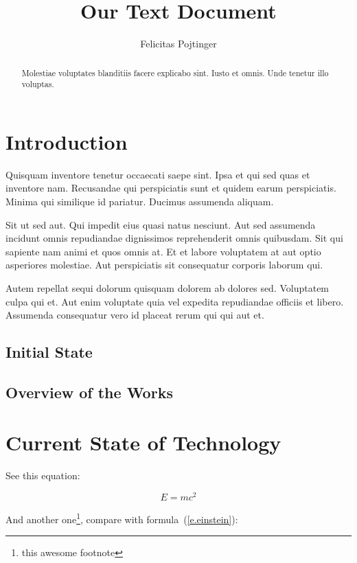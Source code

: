 \documentclass{scrartcl}
\newcommand{\eref}[1]{(\ref{#1})}
\begin{document}
\title{Our Text Document}
\author{Felicitas Pojtinger}
\date{}
\maketitle

\begin{abstract}
    Molestiae voluptates blanditiis facere explicabo sint. Iusto et omnis. Unde tenetur illo voluptas.
\end{abstract}

\section{Introduction}

Quisquam inventore tenetur occaecati saepe sint. Ipsa et qui sed quas et inventore nam. Recusandae qui perspiciatis sunt et quidem earum perspiciatis. Minima qui similique id pariatur. Ducimus assumenda aliquam.

Sit ut sed aut. Qui impedit eius quasi natus nesciunt. Aut sed assumenda incidunt omnis repudiandae dignissimos reprehenderit omnis quibusdam. Sit qui sapiente nam animi et quos omnis at. Et et labore voluptatem at aut optio asperiores molestiae. Aut perspiciatis sit consequatur corporis laborum qui.

Autem repellat sequi dolorum quisquam dolorem ab dolores sed. Voluptatem culpa qui et. Aut enim voluptate quia vel expedita repudiandae officiis et libero. Assumenda consequatur vero id placeat rerum qui qui aut et.

\subsection{Initial State}
\label{s.initial-state}

\subsection{Overview of the Works}

\section{Current State of Technology}

See this equation:

\begin{equation}
    E=mc^2
    \label{e.einstein}
\end{equation}

And another one\footnote{this awesome footnote}, compare with formula~\eref{e.einstein}:
\end{document}
